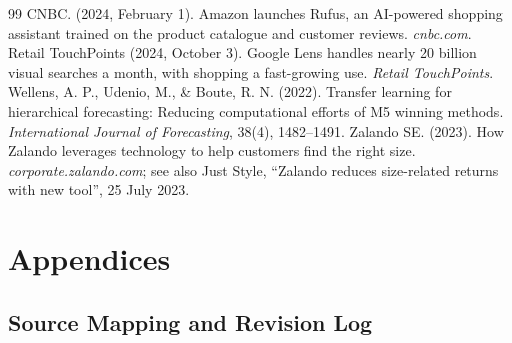 \documentclass[11pt,a4paper,oneside]{extreport}
\begin{document}
\begin{thebibliography}{99}
{ CNBC. (2024, February 1). Amazon launches Rufus, an AI-powered shopping assistant trained on the product catalogue and customer reviews. \emph{cnbc.com}.
 Retail TouchPoints (2024, October 3). Google Lens handles nearly 20 billion visual searches a month, with shopping a fast-growing use. \emph{Retail TouchPoints}.
 Wellens, A. P., Udenio, M., \& Boute, R. N. (2022). Transfer learning for hierarchical forecasting: Reducing computational efforts of M5 winning methods. \emph{International Journal of Forecasting}, 38(4), 1482--1491.
 Zalando SE. (2023). How Zalando leverages technology to help customers find the right size. \emph{corporate.zalando.com}; see also Just Style, ``Zalando reduces size-related returns with new tool'', 25 July 2023.
}
\end{thebibliography}

\appendix
\renewcommand{\thesection}{\Alph{section}}
\chapter*{Appendices}
\setcounter{section}{0}
\setcounter{table}{0}
\renewcommand{\thetable}{A.\arabic{table}}

\section{Source Mapping and Revision Log}
\label{app:revision}
\end{document}

